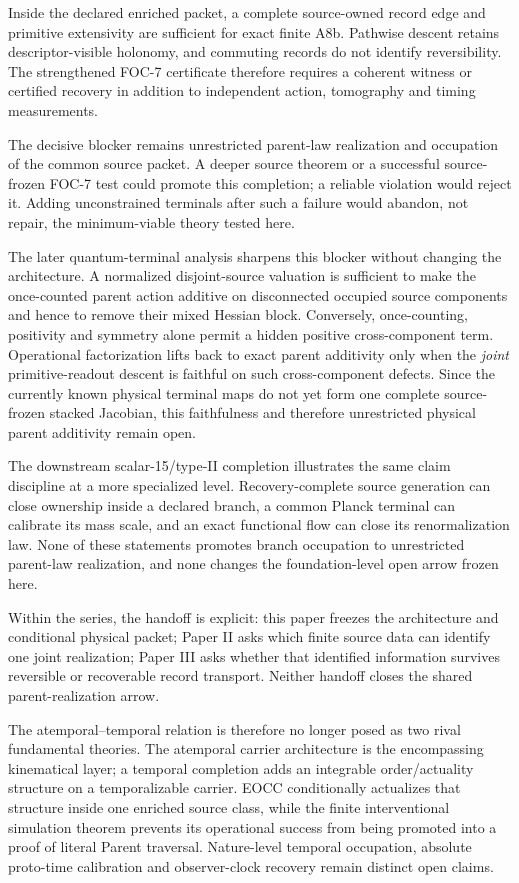 \documentclass[11pt]{article}
\begin{document}
Inside the declared enriched packet, a complete source-owned record edge and
primitive extensivity are sufficient for exact finite A8b.  Pathwise descent
retains descriptor-visible holonomy, and commuting records do not identify
reversibility.  The strengthened FOC-7 certificate therefore requires a
coherent witness or certified recovery in addition to independent action,
tomography and timing measurements.

The decisive blocker remains unrestricted parent-law realization and
occupation of the
common source packet.  A deeper source theorem or a successful source-frozen
  FOC-7 test could promote this completion; a reliable violation would reject
  it.  Adding unconstrained terminals after such a failure would abandon, not
  repair, the minimum-viable theory tested here.

The later quantum-terminal analysis sharpens this blocker without changing
the architecture.  A normalized disjoint-source valuation is sufficient to
make the once-counted parent action additive on disconnected occupied source
components and hence to remove their mixed Hessian block.  Conversely,
once-counting, positivity and symmetry alone permit a hidden positive
cross-component term.  Operational factorization lifts back to exact parent
additivity only when the \emph{joint} primitive-readout descent is faithful on
such cross-component defects.  Since the currently known physical terminal
maps do not yet form one complete source-frozen stacked Jacobian, this
faithfulness and therefore unrestricted physical parent additivity remain open.

The downstream scalar-15/type-II completion illustrates the same claim
discipline at a more specialized level.  Recovery-complete source generation
can close ownership inside a declared branch, a common Planck terminal can
calibrate its mass scale, and an exact functional flow can close its
renormalization law.  None of these statements promotes branch occupation to
unrestricted parent-law realization, and none changes the foundation-level
open arrow frozen here.

Within the series, the handoff is explicit: this paper freezes the architecture
and conditional physical packet; Paper II asks which finite source data can
identify one joint realization; Paper III asks whether that identified
information survives reversible or recoverable record transport.  Neither
handoff closes the shared parent-realization arrow.

The atemporal--temporal relation is therefore no longer posed as two rival
fundamental theories.  The atemporal carrier architecture is the encompassing
kinematical layer; a temporal completion adds an integrable order/actuality
structure on a temporalizable carrier.  EOCC conditionally actualizes that
structure inside one enriched source class, while the finite interventional
simulation theorem prevents its operational success from being promoted into
a proof of literal Parent traversal.  Nature-level temporal occupation,
absolute proto-time calibration and observer-clock recovery remain distinct
open claims.
\end{document}
